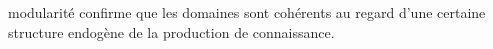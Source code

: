 {modularité confirme que les domaines sont cohérents au regard d'une certaine structure endogène de la production de connaissance.
}



